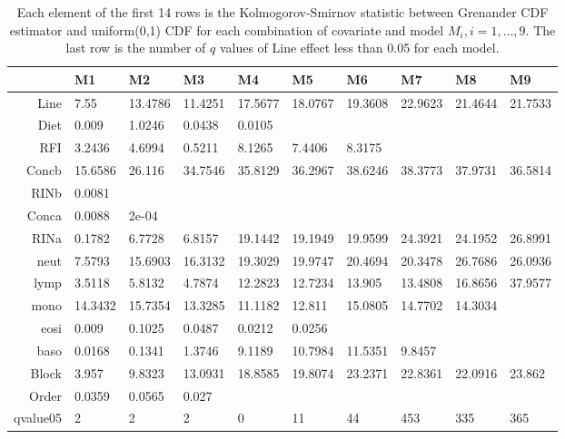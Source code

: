 \documentclass[12pt, letter]{article}\usepackage[]{graphicx}\usepackage[]{color}
\begin{document}
\begin{table}
\centering
\begin{tabular}{|r|l|l|l|l|l|l|l|l|l|}
  \hline
 & M1 & M2 & M3 & M4 & M5 & M6 & M7 & M8 & M9 \\ 
  \hline
Line & 7.55 & 13.4786 & 11.4251 & 17.5677 & 18.0767 & 19.3608 & 22.9623 & 21.4644 & 21.7533 \\ 
  Diet & 0.009 & 1.0246 & 0.0438 & 0.0105 &  &  &  &  &  \\ 
  RFI & 3.2436 & 4.6994 & 0.5211 & 8.1265 & 7.4406 & 8.3175 &  &  &  \\ 
  Concb & 15.6586 & 26.116 & 34.7546 & 35.8129 & 36.2967 & 38.6246 & 38.3773 & 37.9731 & 36.5814 \\ 
  RINb & 0.0081 &  &  &  &  &  &  &  &  \\ 
  Conca & 0.0088 & 2e-04 &  &  &  &  &  &  &  \\ 
  RINa & 0.1782 & 6.7728 & 6.8157 & 19.1442 & 19.1949 & 19.9599 & 24.3921 & 24.1952 & 26.8991 \\ 
  neut & 7.5793 & 15.6903 & 16.3132 & 19.3029 & 19.9747 & 20.4694 & 20.3478 & 26.7686 & 26.0936 \\ 
  lymp & 3.5118 & 5.8132 & 4.7874 & 12.2823 & 12.7234 & 13.905 & 13.4808 & 16.8656 & 37.9577 \\ 
  mono & 14.3432 & 15.7354 & 13.3285 & 11.1182 & 12.811 & 15.0805 & 14.7702 & 14.3034 &  \\ 
  eosi & 0.009 & 0.1025 & 0.0487 & 0.0212 & 0.0256 &  &  &  &  \\ 
  baso & 0.0168 & 0.1341 & 1.3746 & 9.1189 & 10.7984 & 11.5351 & 9.8457 &  &  \\ 
  Block & 3.957 & 9.8323 & 13.0931 & 18.8585 & 19.8074 & 23.2371 & 22.8361 & 22.0916 & 23.862 \\ 
  Order & 0.0359 & 0.0565 & 0.027 &  &  &  &  &  &  \\ 
  qvalue05 & 2 & 2 & 2 & 0 & 11 & 44 & 453 & 335 & 365 \\ 
   \hline
\end{tabular}
\caption{Each element of the first 14 rows is the Kolmogorov-Smirnov statistic between Grenander CDF estimator and uniform(0,1) CDF for each combination of covariate and model $M_i, i = 1, \dots, 9$. The last row is the number of $q$ values  of Line effect less than 0.05 for each model.} 
\label{tableks}
\end{table}
\end{document}
